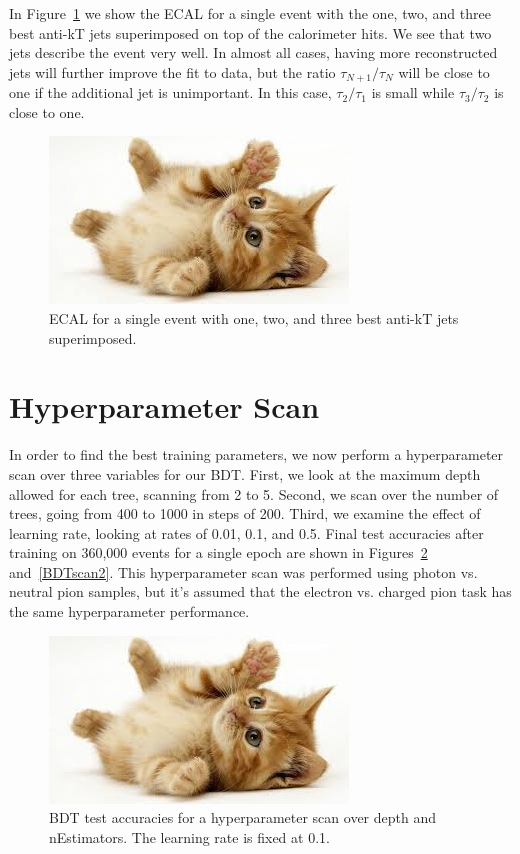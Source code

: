\documentclass{article}
\begin{document}
    In Figure~\ref{ECALjets} we show the ECAL for a single event with the one, two, and three best anti-kT jets superimposed on top of the calorimeter hits. We see that two jets describe the event very well. In almost all cases, having more reconstructed jets will further improve the fit to data, but the ratio $\tau_{N+1}/\tau_N$ will be close to one if the additional jet is unimportant. In this case, $\tau_2/\tau_1$ is small while $\tau_3/\tau_2$ is close to one.

    \begin{figure}
        \begin{center}
            \includegraphics{images/cat-thumb.jpeg}
        \end{center}
        \caption{ECAL for a single event with one, two, and three best anti-kT jets superimposed.}
        \label{ECALjets}
    \end{figure}

    \section*{Hyperparameter Scan}

    In order to find the best training parameters, we now perform a hyperparameter scan over three variables for our BDT. First, we look at the maximum depth allowed for each tree, scanning from 2 to 5. Second, we scan over the number of trees, going from 400 to 1000 in steps of 200. Third, we examine the effect of learning rate, looking at rates of 0.01, 0.1, and 0.5. Final test accuracies after training on 360,000 events for a single epoch are shown in Figures~\ref{BDTscan1} and~\ref{BDTscan2}. This hyperparameter scan was performed using photon vs. neutral pion samples, but it's assumed that the electron vs. charged pion task has the same hyperparameter performance.

    \begin{figure}
        \begin{center}
            \includegraphics{images/cat-thumb.jpeg}
        \end{center}
        \caption{BDT test accuracies for a hyperparameter scan over depth and nEstimators. The learning rate is fixed at 0.1.}
        \label{BDTscan1}
    \end{figure}
\end{document}
